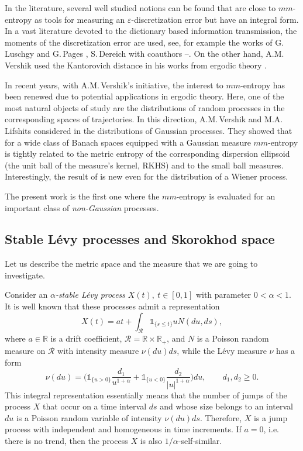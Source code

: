 \documentclass[12pt]{article}
\let\al\alpha
\let\ep\varepsilon
\newcommand{\R}{\mathbb{R}}
\theoremstyle{definition}
\begin{document}
In the literature, several well studied notions can be found that are close to $mm$-entropy as
tools for measuring an $\ep$-discretization error but have an integral form. In a vast literature devoted to the dictionary based information transmission, the moments of the discretization error are used, see, for example the works of G.\,Luschgy and G.\,Pages \cite{LuschPa04},
S.\,Dereich with coauthors \cite{Der_dis}--\cite{DerLif}. On the other hand, A.M.\,Vershik used the Kantorovich distance in his works from ergodic theory \cite{Ver10}.

In recent years, with A.M.\,Vershik's initiative, the interest to $mm$-entropy has been renewed due to potential applications in ergodic theory.
Here, one of the most natural objects of study are the distributions of random processes in the corresponding spaces of trajectories.
In this direction, A.M.\,Vershik and M.A.\,Lifshits considered in \cite{VerLif} the distributions of Gaussian processes. They showed
that for a wide class of Banach spaces equipped with a Gaussian measure $mm$-entropy is tightly related to the metric entropy of the corresponding dispersion ellipsoid (the unit ball of the measure's kernel, RKHS) and to the small ball measures. Interestingly, the result of \cite{VerLif} is new even for the distribution of a Wiener process.

The present work is the first one where the $mm$-entropy is evaluated for an important class of {\it non-Gaussian} processes.


\subsection{Stable L\'evy processes and Skorokhod space}

Let us describe the metric space and the measure that we  are going to investigate.


Consider an {\it $\alpha$-stable L\'evy process} $X(t), \ t\in[0, 1]$ with parameter $0 < \alpha < 1$. It is well known that these processes admit a representation
\begin{equation*}
        X(t) = %
        a t + \int_{\mathcal{R}}\mathds{1}_{\{s \leq t\}}u N(du, ds),
\end{equation*}
where $a\in \R$ is a drift coefficient, $\mathcal{R} = \R \times \R_{+}$,  and $N$ is a Poisson random measure on
$\mathcal{R}$ with intensity measure $\nu(du)ds$, while the L\'evy measure $\nu$ has a form
\begin{equation}\label{common: measure nu}
      \nu(du) = \Big(\mathds{1}_{\{u>0\}}\frac{d_1}{u^{1 + \alpha}} + \mathds{1}_{\{u<0\}}\frac{d_2}{|u|^{1+\al}}\Big)du, \qquad  d_1, d_2\geq 0.
\end{equation}
This integral representation essentially means that the number of jumps of the process $X$ that occur on a time
interval $ds$ and whose size belongs  to an interval $du$ is a Poisson random variable of intensity $\nu(du)ds$.
Therefore, $X$ is a jump process with independent and homogeneous in time increments.
If $a=0$, i.e. there is no trend, then the process $X$ is also $1/\alpha$-self-similar.
\end{document}
